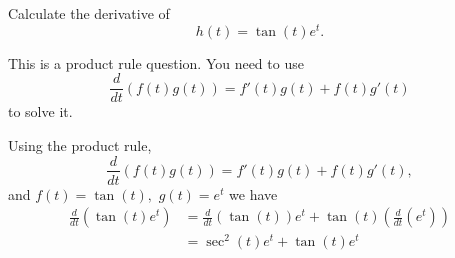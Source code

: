 \documentclass{ximera}
\author{Emma Smith Zbarsky}
\begin{document}
\begin{exercise}

Calculate the derivative of \[h(t) = \tan(t)e^t.\]


\begin{hint}
This is a product rule question. You need to use
\[\frac{d}{dt}\left(f(t)g(t)\right) = f'(t)g(t)+f(t)g'(t)\] to solve it.
\end{hint}


\begin{hint}
Using the product rule,
\[\frac{d}{dt}\left(f(t)g(t)\right) = f'(t)g(t)+f(t)g'(t),\] and
$f(t) = \tan(t),$ $g(t) = e^t$ we have
\begin{align*} \frac{d}{dt}\left(\tan(t)e^t\right) &= \frac{d}{dt}\left(\tan(t)\right)e^t+\tan(t)\left(\frac{d}{dt}\left(e^t\right)\right) \\
&= \boxed{\sec^2(t)e^t + \tan(t)e^t}
\end{align*}
\end{hint}


\begin{multipleChoice}
\end{multipleChoice}

\end{exercise}
\end{document}
